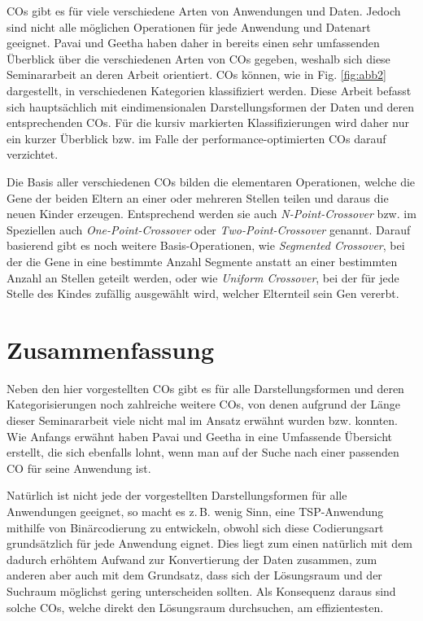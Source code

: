 \documentclass{llncs}
\newcommand{\zB}{z.\,B. }
\begin{document}
COs gibt es für viele verschiedene Arten von Anwendungen und Daten. Jedoch sind nicht alle möglichen Operationen für jede Anwendung und Daten\-art ge\-ei\-gnet. Pavai und Geetha haben daher in \cite{Survey} bereits einen sehr umfassenden Überblick über die verschiedenen Arten von COs gegeben, weshalb sich diese Seminararbeit an deren Arbeit orientiert. COs können, wie in Fig. \ref{fig:abb2} dargestellt, in verschiedenen Kategorien klassifiziert werden. Diese Arbeit befasst sich hauptsächlich mit eindimensionalen Darstellungsformen der Daten und deren entsprechenden COs. Für die kursiv markierten Klassifizierungen wird daher nur ein kurzer Überblick bzw. im Falle der performance-optimierten COs darauf verzichtet.

Die Basis aller verschiedenen COs bilden die elementaren Operationen, wel\-che die Gene der beiden Eltern an einer oder mehreren Stellen teilen und daraus die neuen Kinder erzeugen. Entsprechend werden sie auch \textit{N-Point-Crossover} bzw. im Speziellen auch \textit{One-Point-Crossover} oder \textit{Two-Point-Crossover} ge\-nannt. Darauf basierend gibt es noch weitere Basis-Operationen, wie \textit{Segmented Cross\-over}, bei der die Gene in eine bestimmte Anzahl Segmente anstatt an einer bestimmten Anzahl an Stellen geteilt werden, \cite{GABasicIdeas} oder wie \textit{Uniform Crossover}, bei der für jede Stelle des Kindes zufällig ausgewählt wird, welcher Elternteil sein Gen vererbt.



\section{Zusammenfassung}
\label{sec:ZusFass}

	Neben den hier vorgestellten COs gibt es für alle Darstellungsformen und deren Kategorisierungen noch zahlreiche weitere COs, von denen aufgrund der Länge dieser Seminararbeit viele nicht mal im Ansatz erwähnt wurden bzw. konnten. Wie Anfangs erwähnt haben Pavai und Geetha in \cite{Survey} eine Umfassende Übersicht erstellt, die sich ebenfalls lohnt, wenn man auf der Suche nach einer passenden CO für seine Anwendung ist.
	
	Natürlich ist nicht jede der vorgestellten Darstellungsformen für alle Anwendungen geeignet, so macht es \zB wenig Sinn, eine TSP-Anwendung mithilfe von Binärcodierung zu entwickeln, obwohl sich diese Codierungsart grundsätzlich für jede Anwendung eignet. Dies liegt zum einen natürlich mit dem dadurch erhöhtem Aufwand zur Konvertierung der Daten zusammen, zum anderen aber auch mit dem Grundsatz, dass sich der Lösungsraum und der Suchraum möglichst gering unterscheiden sollten. \cite{TacklingRealCodedGA} Als Konsequenz daraus sind solche COs, welche direkt den Lösungsraum durchsuchen, am effizientesten.
	
\end{document}
